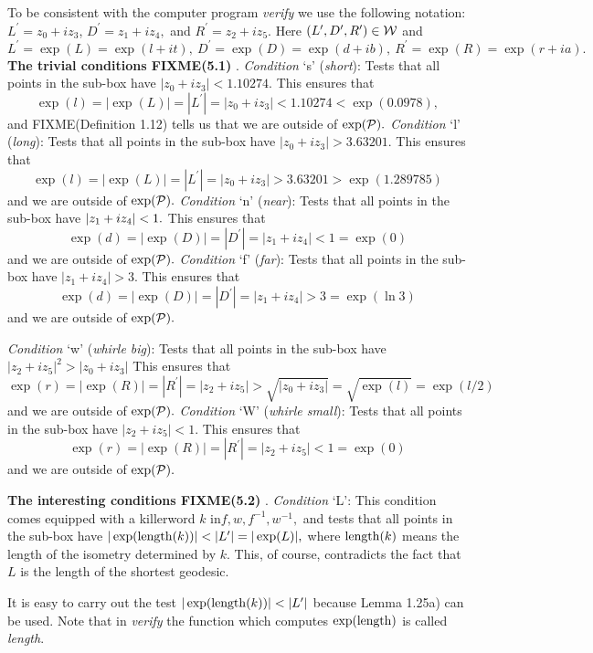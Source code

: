 To be consistent with the computer program {\it verify} we use the following notation: $L^{\prime} = z_0 + i z_3$,
$D^{\prime} = z_1 + i z_4,$ and $R^{\prime} = z_2 + i z_5.$  Here $(L^{\prime}, D^{\prime}, R^{\prime}) \in {\cal W}$ and
$L^{\prime} = \exp(L) = \exp(l+it),\   D^{\prime} = \exp(D) = \exp(d+ib),\  
R^{\prime} = \exp(R) = \exp(r+ia).$
 {{\bf The trivial conditions  
FIXME(5.1)
}}.
{\it Condition} `s' ({\it short}):  Tests that all points in the sub-box have $|z_0 + i z_3| < 1.10274.$  This ensures that  
$$\exp(l) = |\exp(L)| = |L^{\prime}| = |z_0 + i z_3| < 1.10274 < \exp(0.0978),$$  and
FIXME(Definition 1.12)
 tells us that we are
outside of $\exp({\cal P}).$
{\it Condition} `l' ({\it long}): Tests that all points in the sub-box have $|z_0 + i z_3| > 3.63201.$  This ensures that  
$$\exp(l) = |\exp(L)| = |L^{\prime}| = |z_0 + i z_3| > 3.63201 > \exp(1.289785)$$ and we are outside of $\exp({\cal P}).$  
\vglue6pt
{\it Condition} `n' ({\it near}): Tests that all points in the sub-box have $|z_1 + i z_4|\break < 1.$  This ensures that 
$$\exp(d) = |\exp(D)| = |D^{\prime}| = |z_1 + i z_4| <1= \exp(0)$$ and we are outside of $\exp({\cal P}).$
\vglue6pt
{\it Condition} `f' ({\it far}): Tests that all points in the sub-box have $|z_1 + i z_4| > 3.$  This ensures that 
$$\exp(d) = |\exp(D)| = |D^{\prime}| = |z_1 + i z_4|  > 3= \exp(\ln 3)$$ and we are outside of $\exp({\cal P}).$  
\eject

{\it Condition} `w' ({\it whirle  big}): Tests that all points in the sub-box have $|z_2 + i z_5|^2 > |z_0 + i z_3| $  This
ensures that $$\exp(r) = |\exp(R)| = |R^{\prime}| = |z_2 + i z_5|  > \sqrt{|z_0 + i z_3|} =  \sqrt {\exp(l)} = \exp(l/2)$$ and
we are outside of $\exp({\cal P}).$  
{\it Condition} `W' ({\it whirle  small}): Tests that all points in the sub-box have $|z_2 + i z_5| < 1. $  This ensures that
$$\exp(r) = |\exp(R)| = |R^{\prime}| = |z_2 + i z_5|  < 1 = \exp(0)$$ and we are outside of $\exp({\cal P}).$

 {{\bf The interesting conditions 
FIXME(5.2)
}}.
{\it Condition}  `L': This condition comes equipped with a killerword $k$ in\break $f, w, f^{-1}, w^{-1},$ and tests that all
points in the sub-box have $|\exp({\rm length}(k))| <  |L^{\prime}| = |\exp(L)|,$ where ${\rm length}(k)$ means the length
of the isometry determined by $k.$   This, of course, contradicts the fact that $L$ is the length of the shortest geodesic.

It is easy to carry out the test $|\exp({\rm length}(k))| <  |L^{\prime}|$ because
Lemma 1.25a) can be used.
Note that in {\it verify} the function which computes $\exp({\rm length})$ is called {\it length}.  

